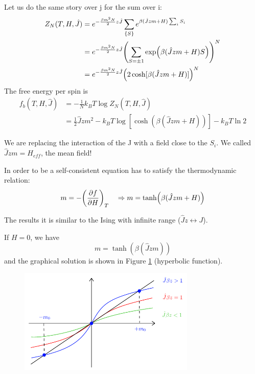 \documentclass[../main/main.tex]{subfiles}
\begin{document}
Let us do the same story over j for the sum over i:
\begin{equation}
\begin{split}
  Z_N (T,H,\hat{J} ) &= e^{-\frac{\beta m^2 N}{2} z \hat{J} } \sum_{\{ S \}  }^{}  e^{\beta (\hat{J}zm + H ) \sum_{i}^{} S_i } \\
  & = e^{-\frac{\beta m^2 N}{2} z \hat{J} } \qty(\sum_{S=\pm 1}^{}  \exp (\beta (\hat{J}zm+H )S)  )^N \\
  & = e^{-\frac{\beta m^2 N}{2} z \hat{J} } \qty(2 \cosh [\beta (\hat{J}zm+H )])^N
\end{split}
\end{equation}
The free energy per spin is
\begin{equation}
\begin{split}
  f_b (T,H,\hat{J} ) &=  - \frac{1}{N}k_B T \log{Z_N} (T,H,\hat{J} ) \\
                    &= \frac{1}{2}\hat{J} z m^2 -k_B T \log{[\cosh(\beta (\hat{J} z m + H))]} - k_B T \ln{2}
\end{split}
\end{equation}

\begin{remark}
We are replacing the interaction of the J with a field close to the \( S_i \). We called \( \hat{J} z m = H_{eff}  \), the mean field!
\end{remark}

In order to be a self-consistent equation has to satisfy the  thermodynamic relation:
\begin{equation}
  m = - \qty( \pdv{f}{H})_T \quad \Rightarrow   m = \tanh (\beta (\hat{J}z m + H  ))
\end{equation}
\begin{remark}
The results it is similar to the Ising with infinite range (\( \hat{J}z \leftrightarrow J  \)).
\end{remark}
If \( H=0 \), we have
\begin{equation}
  m =  \tanh (\beta (\hat{J}z m ))
\end{equation}
and the graphical solution is shown in Figure \ref{fig:11_1} (hyperbolic function).


\begin{figure}[h!]
\centering
\includegraphics[width=0.75\textwidth]{../lessons/11_image/1.pdf}
\caption{\label{fig:11_1}}
\end{figure}
\end{document}
